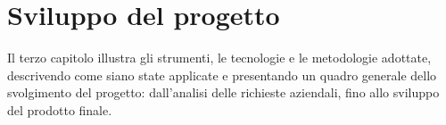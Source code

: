 \chapter{Sviluppo del progetto}
Il terzo capitolo illustra gli strumenti, le tecnologie e le metodologie adottate, descrivendo come siano state applicate e presentando un quadro generale dello svolgimento del progetto: dall'analisi delle richieste aziendali, fino allo sviluppo del prodotto finale. 





